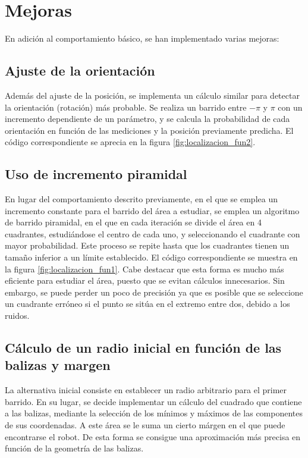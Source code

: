 
\section{Mejoras}
En adición al comportamiento básico, se han implementado varias mejoras:
\subsection{Ajuste de la orientación} Además del ajuste de la posición, se implementa un cálculo similar para detectar la orientación (rotación) más probable. Se realiza un barrido entre $-\pi$ y $\pi$ con un incremento dependiente de un parámetro, y se calcula la probabilidad de cada orientación en función de las mediciones y la posición previamente predicha. El código correspondiente se aprecia en la figura \ref{fig:localizacion_fun2}.
\subsection{Uso de incremento piramidal} En lugar del comportamiento descrito previamente, en el que se emplea un incremento constante para el barrido del área a estudiar, se emplea un algoritmo de barrido piramidal, en el que en cada iteración se divide el área en 4 cuadrantes,
estudiándose el centro de cada uno, y seleccionando el cuadrante con mayor probabilidad. Este proceso se repite hasta que los cuadrantes tienen un tamaño inferior a un límite establecido. El código correspondiente se muestra en la figura \ref{fig:localizacion_fun1}. Cabe destacar
que esta forma es mucho más eficiente para estudiar el área, puesto que se evitan cálculos innecesarios. Sin embargo, se puede perder un poco de precisión ya que es posible que se seleccione un cuadrante erróneo si el punto se sitúa en el extremo entre dos, debido a los ruidos.
\subsection{Cálculo de un radio inicial en función de las balizas y margen} La alternativa inicial consiste en establecer un radio arbitrario para el primer barrido. En su lugar,
se decide implementar un cálculo del cuadrado que contiene a las balizas, mediante la selección de los mínimos y máximos de las componentes de sus coordenadas. A este área se le suma un cierto márgen
en el que puede encontrarse el robot. De esta forma se consigue una aproximación más precisa en función de la geometría de las balizas.

